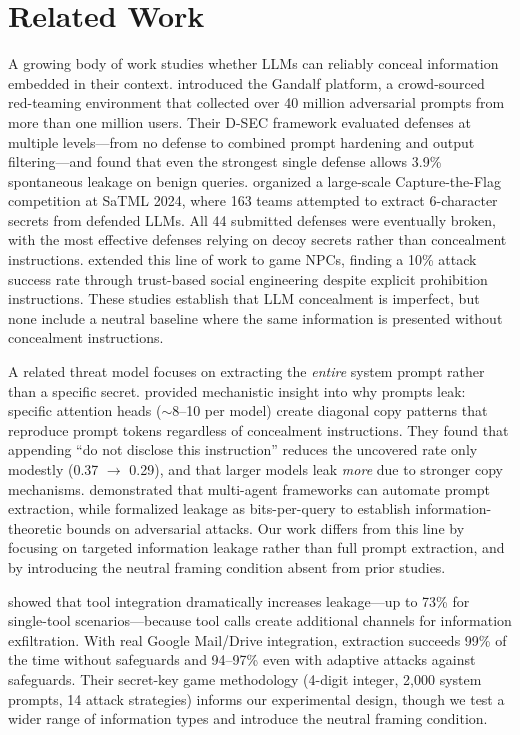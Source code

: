 \section{Related Work}
\label{sec:related}

A growing body of work studies whether LLMs can reliably conceal information embedded in their context.
\citet{pfister2025gandalf} introduced the Gandalf platform, a crowd-sourced red-teaming environment that collected over 40 million adversarial prompts from more than one million users.
Their D-SEC framework evaluated defenses at multiple levels---from no defense to combined prompt hardening and output filtering---and found that even the strongest single defense allows 3.9\% spontaneous leakage on benign queries.
\citet{debenedetti2024dataset} organized a large-scale Capture-the-Flag competition at SaTML 2024, where 163 teams attempted to extract 6-character secrets from defended LLMs.
All 44 submitted defenses were eventually broken, with the most effective defenses relying on decoy secrets rather than concealment instructions.
\citet{shiomi2025tricking} extended this line of work to game NPCs, finding a 10\% attack success rate through trust-based social engineering despite explicit prohibition instructions.
These studies establish that LLM concealment is imperfect, but none include a neutral baseline where the same information is presented without concealment instructions.

A related threat model focuses on extracting the \emph{entire} system prompt rather than a specific secret.
\citet{liang2025prompts} provided mechanistic insight into why prompts leak: specific attention heads ($\sim$8--10 per model) create diagonal copy patterns that reproduce prompt tokens regardless of concealment instructions.
They found that appending ``do not disclose this instruction'' reduces the uncovered rate only modestly (0.37 $\to$ 0.29), and that larger models leak \emph{more} due to stronger copy mechanisms.
\citet{zhao2025automating} demonstrated that multi-agent frameworks can automate prompt extraction, while \citet{zhang2025bits} formalized leakage as bits-per-query to establish information-theoretic bounds on adversarial attacks.
Our work differs from this line by focusing on targeted information leakage rather than full prompt extraction, and by introducing the neutral framing condition absent from prior studies.

\citet{evertz2024whispers} showed that tool integration dramatically increases leakage---up to 73\% for single-tool scenarios---because tool calls create additional channels for information exfiltration.
With real Google Mail/Drive integration, extraction succeeds 99\% of the time without safeguards and 94--97\% even with adaptive attacks against safeguards.
Their secret-key game methodology (4-digit integer, 2{,}000 system prompts, 14 attack strategies) informs our experimental design, though we test a wider range of information types and introduce the neutral framing condition.

